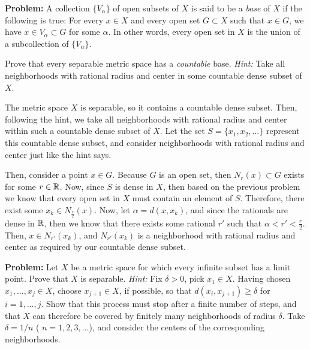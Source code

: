 \documentclass[10pt]{article}
\newenvironment{problem}{\textbf{Problem:}}{}
\begin{document}
	\begin{problem}
		A collection \( \{V_\alpha\}  \) of open subsets of \( X \) is said to be a \textit{base} of \( X \) 
		if the following is true: For every \( x \in X \) and every open set \( G \subset X \) 
		such that \( x \in G \), we have \( x \in V_\alpha \subset G \) for some 
		\( \alpha \). In other words, every open set in  \( X \) is the union of a subcollection of 
		\( \{V_\alpha\}  \). 

		Prove that every separable metric space has a \textit{countable} base. \textit{Hint:} Take 
		all neighborhoods with rational radius and center in some countable dense subset of \( X \).   
	\end{problem}

	\begin{solution}
		The metric space \( X \) is separable, so it contains a countable dense subset. Then, following the hint, 
		we take all neighborhoods with rational radius and center within such a countable dense subset of \( X \). 
		Let the set \( S = \{x_1, x_2, \dots \}  \) represent this countable dense subset, and consider neighborhoods
		with rational radius and center just like the hint says. 

		Then, consider a point \( x \in G \). Because \( G \) is an open set, then \( N_r(x) \subset G\) exists 
		for some \( r \in \mathbb R \). Now, since \( S \) is dense in \( X \), then based on the previous problem 
		we know that every open set in \( X \) must contain an element of \( S \). Therefore, 
		there exist some \( x_k \in N_{\frac{r}{2}}(x) \). Now, let \( \alpha = d(x, x_k) \), and since the 
		rationals are dense in \( \mathbb R \), then we know that there exists some rational \( r' \) such that 
		\( \alpha < r' < \frac{r}{2} \). Then, \( x \in N_{r'}(x_k) \), and \( N_{r'}(x_k) \) is a neighborhood 
		with rational radius and center as required by our countable dense subset. 
	\end{solution}

	\begin{problem}
		Let \( X \) be a metric space for which every infinite subset has a limit point. Prove that 
		\( X \) is separable. \textit{Hint:} Fix \( \delta > 0 \), pick \( x_1 \in X \). Having chosen 
		\( x_1, \dots, x_j \in X \), choose \( x_{j+1} \in X \), if possible, so that \( d(x_i, x_{j+1})
		\ge  \delta \) for \( i = 1, \dots, j \). Show that this process must stop after a finite number of 
		steps, and that \( X \) can therefore be covered by finitely many neighborhoods of radius \( \delta \). 
		Take \( \delta = 1 / n \) ( \( n = 1, 2, 3, \dots \)), and consider the centers of the corresponding
		neighborhoods. 
	\end{problem}
\end{document}
